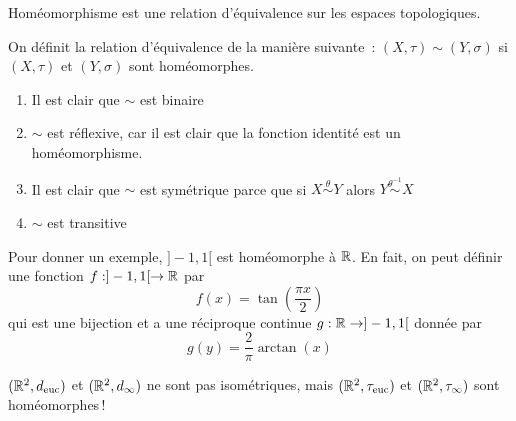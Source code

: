 \documentclass[french]{article}
\begin{document}
\begin{lemme}
  Homéomorphisme est une relation d’équivalence sur les espaces topologiques.
  \tcblower
  \begin{preuve}
    On définit la relation d'équivalence de la manière suivante : $(X, \tau) \sim (Y, \sigma)$ si $(X, \tau)$ et $(Y, \sigma)$ sont homéomorphes.
    \begin{enumerate}
      \item Il est clair que $\sim$ est binaire
      \item $\sim$ est réflexive, car il est clair que la fonction identité est un homéomorphisme.
      \item Il est clair que $\sim$ est symétrique parce que si $X \overset{\theta}{\sim} Y$ alors $Y \overset{\theta^{-1}}{\sim}X$
      \item $\sim$ est transitive
    \end{enumerate}
  \end{preuve}
\end{lemme}
Pour donner un exemple, $]-1, 1[$ est homéomorphe à $\mathbb{R}$. En fait, on peut définir une fonction $f: ]-1, 1[ \rightarrow \mathbb{R}$ par
$$f(x) = \tan\left(\frac{\pi x}{2} \right)$$ 
qui est une bijection et a une réciproque continue $g: \mathbb{R} \rightarrow ]-1, 1[$ donnée par
$$g(y) = \frac{2}{\pi}\arctan(x)$$

\begin{remarque}
  $(\mathbb{R}^2, d_\text{euc})$ et $(\mathbb{R}^2, d_\infty)$ ne sont pas isométriques, mais $(\mathbb{R}^2, \tau_\text{euc})$ et $(\mathbb{R}^2, \tau_\infty)$ sont homéomorphes ! 
\end{remarque}
\end{document}
